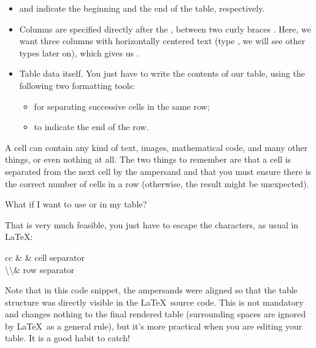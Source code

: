 \begin{itemize}
    \item {} and  indicate the beginning and the end of the table, respectively.
    \item Columns are specified directly after the , between two curly braces \snippet{\{\}}. Here, we want three columns with horizontally centered text (type , we will see other types later on), which gives us .
    \item Table data itself. You just have to write the contents of our table, using the following two formatting tools:
    \begin{itemize}
        \item \snippet{\&} for separating successive cells in the same row;
        \item \snippet{\textbackslash\textbackslash} to indicate the end of the row.
    \end{itemize}
\end{itemize}

A cell can contain any kind of text, images, mathematical code, and many other things, or even nothing at all. The two things to remember are that a cell is separated from the next cell by the ampersand \snippet{\&} and that you must ensure there is the correct number of cells in a row (otherwise, the result might be unexpected).

\begin{questionbox}{}
What if I want to use \snippet{\&} or \snippet{\textbackslash\textbackslash} in my table?
\end{questionbox}

That is very much feasible, you just have to escape the characters, as usual in \LaTeX:

\begin{Code}
\begin{tblr}{cc}
	\&                           & cell separator \\
	\textbackslash\textbackslash & row separator \\
\end{tblr}
\end{Code}

Note that in this code snippet, the ampersands were aligned so that the table structure was directly visible in the \LaTeX\ source code. This is not mandatory and changes nothing to the final rendered table (surrounding spaces are ignored by \LaTeX\ as a general rule), but it's more practical when you are editing your table. It is a good habit to catch!

